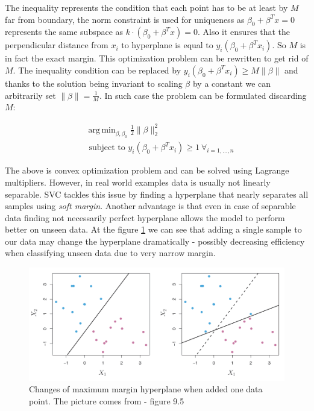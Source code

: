 \documentclass[12pt, wide]{mwart}
\DeclareMathOperator*{\argmin}{arg\,min}
\begin{document}
The inequality represents the condition that each point has to be at least by $M$ far from boundary, the norm constraint is used for uniqueness as $\beta_0 +\beta^Tx = 0$ represents the same subspace as $k\cdot(\beta_0 +\beta^Tx) = 0$. Also it ensures that the perpendicular distance from $x_i$ to hyperplane is equal to $y_i\left(\beta_0 + \beta^Tx_i\right)$. So $M$ is in fact the exact margin. This optimization problem can be rewritten to get rid of $M$. The inequality condition can be replaced by $y_{i}\left(\beta_{0}+\beta^T x_i\right) \geq M\|\beta\|$ and thanks to the solution being invariant to scaling $\beta$ by a constant we can arbitrarily set $\|\beta\| = \frac{1}{M}$. In such case the problem can be formulated discarding $M$:

\begin{align*}
& \argmin_{\beta, \beta_0} \frac{1}{2}\|\beta\|^2_2 \\ &{\text { subject to }} {y_{i}\left(\beta_{0}+\beta^T x_i\right) \geq 1 \ \forall_{i=1, \ldots, n}}
\end{align*}

The above is convex optimization problem and can be solved using Lagrange multipliers. However, in real world examples data is usually not linearly separable. SVC tackles this issue by finding a hyperplane that nearly separates all samples using \textit{soft margin}. Another advantage is that even in case of separable data finding not necessarily perfect hyperplane allows the model to perform better on unseen data. At the figure \ref{fig:svc-robust} we can see that adding a single sample to our data may change the hyperplane dramatically - possibly decreasing efficiency when classifying unseen data due to very narrow margin. 

\begin{figure}
\centering
\includegraphics[width=\textwidth]{images/svc-robust.png}
\caption{Changes of maximum margin hyperplane when added one data point. The picture comes from \cite{ISL} - figure 9.5}
\label{fig:svc-robust}
\end{figure}
\end{document}
